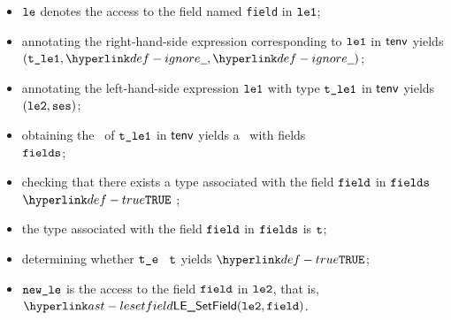 \ProseParagraph
\AllApply
\begin{itemize}
  \item $\vle$ denotes the access to the field named \texttt{field} in $\vleone$;
  \item annotating the right-hand-side expression corresponding to $\vleone$ in $\tenv$ yields \\ $(\vtleone, \Ignore, \Ignore)$\ProseOrTypeError;
  \item annotating the left-hand-side expression  $\vleone$ with type $\vtleone$ in $\tenv$ yields \\ $(\vletwo, \vses)$\ProseOrTypeError;
  \item obtaining the \underlyingtype\ of $\vtleone$ in $\tenv$ yields a \structuredtype\ with fields \\
        $\fields$\ProseOrTypeError;
  \item checking that there exists a type associated with the field $\field$ in $\fields$ $\True$ \ProseTerminateAs{\BadField};
  \item the type associated with the field $\field$ in $\fields$ is $\vt$;
  \item determining whether $\vte$ \typesatisfies\ $\vt$ yields $\True$\ProseOrTypeError;
  \item $\newle$ is the access to the field $\field$ in $\vletwo$, that is, $\LESetField(\vletwo, \field)$.
\end{itemize}
\FormallyParagraph
\begin{mathpar}
\end{mathpar}

